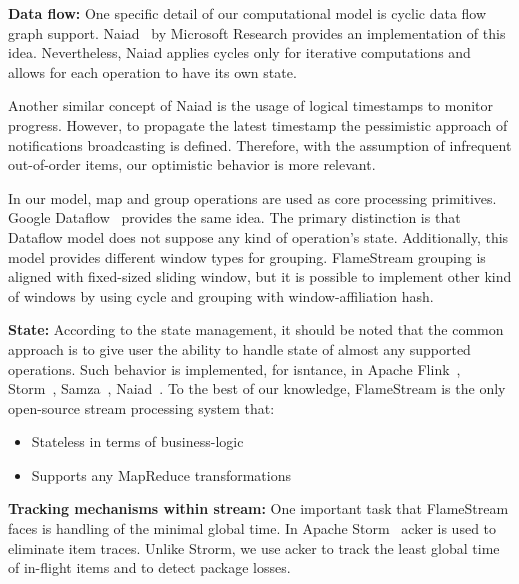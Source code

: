 
\label {fs-related-section}

{\bf Data flow:}
One specific detail of our computational model is cyclic data flow graph support. Naiad~\cite{Murray:2013:NTD:2517349.2522738} by Microsoft Research provides an implementation of this idea. Nevertheless, Naiad applies cycles only for iterative computations and allows for each operation to have its own state. 

Another similar concept of Naiad is the usage of logical timestamps to monitor progress. However, to propagate the latest timestamp the pessimistic approach of notifications broadcasting is defined. Therefore, with the assumption of infrequent out-of-order items, our optimistic behavior is more relevant.

In our model, map and group operations are used as core processing primitives. Google Dataflow~\cite{Akidau:2015:DMP:2824032.2824076} provides the same idea. The primary distinction is that Dataflow model does not suppose any kind of operation's state. Additionally, this model provides different window types for grouping. FlameStream grouping is aligned with fixed-sized sliding window, but it is possible to implement other kind of windows by using cycle and grouping with window-affiliation hash.

{\bf State:}
According to the state management, it should be noted that the common approach is to give user the ability to handle state of almost any supported operations. Such behavior is implemented, for isntance, in Apache Flink~\cite{carbone2015apache}, Storm~\cite{apache:storm}, Samza~\cite{Noghabi:2017:SSS:3137765.3137770}, Naiad~\cite{Murray:2013:NTD:2517349.2522738}.
To the best of our knowledge, FlameStream is the only open-source stream processing system that:
\begin{itemize}
    \item Stateless in terms of business-logic
    \item Supports any MapReduce transformations 
\end{itemize}

{\bf Tracking mechanisms within stream:}
One important task that FlameStream faces is handling of the minimal global time. In Apache Storm~\cite{apache:storm} acker is used to eliminate item traces. Unlike Strorm, we use acker to track the least global time of in-flight items and to detect package losses.
